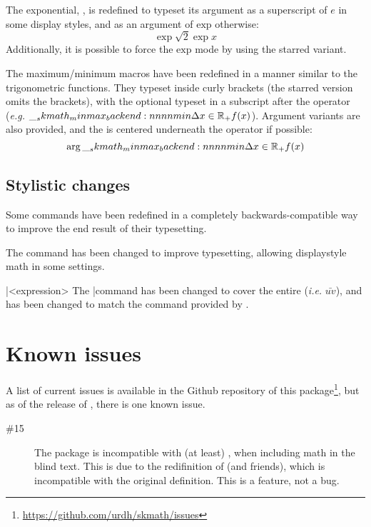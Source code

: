 \documentclass[commonsets,load]{skdoc}
\begin{document}
  \DescribeMacro{}
  The exponential, \Macro\exp, is redefined to typeset its argument as a
  superscript of \(e\) in some display styles, and as an argument of
  \(\mathrm{exp}\) otherwise:
  \begin{equation*}
    \exp{\sqrt{2}\exp{x}}
  \end{equation*}
  Additionally, it is possible to force the \(\mathrm{exp}\) mode by
  using the starred variant.

  \DescribeMacro{}
  \DescribeMacro{}
  \DescribeMacro{}
  \DescribeMacro{}
  \DescribeMacro{}
  \DescribeMacro{}
  The maximum/minimum macros have been redefined in a manner similar to
  the trigonometric functions. They typeset  inside
  curly brackets (the starred version omits the brackets), with the
  optional  typeset in a subscript after the operator
  (\emph{e.g.} \(\min*[x\in\R_{+}]{f(x)}\)). Argument variants are also
  provided, and the  is centered underneath the operator
  if possible:
  \begin{equation*}
    \argmin*[x\in\R_{+}]{f(x)}
  \end{equation*}

  \subsection{Stylistic changes}
  Some commands have been redefined in a completely backwards-compatible
  way to improve the end result of their typesetting.
 
  \DescribeMacro{}
  The \Macro\frac command has been changed to improve typesetting,
  allowing displaystyle math in some settings.
 
  \DescribeMacro\bar{<expression>}
  \DescribeMacro{}
  The \Macro\bar command has been changed to cover the entire 
   (\emph{i.e.} \(\bar{uv}\)), and \Macro\vec has
  been changed to match the  command provided by 
  .

  \section{Known issues}
  A list of current issues is available in the Github repository of this
  package\footnote{\url{https://github.com/urdh/skmath/issues}}, but as
  of the release of \theversion, there is one known issue.
  \begin{description}
      \item[\#15] The package is incompatible with (at least)
        , when including math in the blind text. This
        is due to the redifinition of  (and friends), which
        is incompatible with the original  definition.
        This is a feature, not a bug.
  \end{description}
\end{document}
